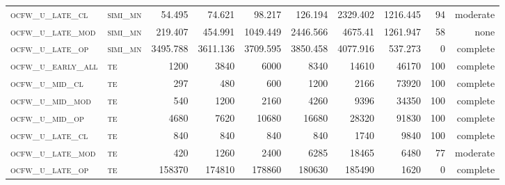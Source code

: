 \begin{landscape}
\begin{center}
\begin{footnotesize}
\begin{longtable}{llrrrrr|rrr}
\textsc{ocfw\_u\_late\_cl  } & \textsc{simi\_mn  }    & 54.495   & 74.621   & 98.217   & 126.194  & 2329.402  & 1216.445      & 94            & moderate       \\
\textsc{ocfw\_u\_late\_mod } & \textsc{simi\_mn  }    & 219.407  & 454.991  & 1049.449 & 2446.566 & 4675.41   & 1261.947      & 58            & none       \\
\textsc{ocfw\_u\_late\_op  } & \textsc{simi\_mn  }    & 3495.788 & 3611.136 & 3709.595 & 3850.458 & 4077.916  & 537.273       & 0             & complete           \\
\textsc{ocfw\_u\_early\_all} & \textsc{te  	     }    & 1200     & 3840     & 6000     & 8340     & 14610     & 46170         & 100           & complete            \\
\textsc{ocfw\_u\_mid\_cl   } & \textsc{te        }    & 297      & 480      & 600      & 1200     & 2166      & 73920         & 100           & complete            \\
\textsc{ocfw\_u\_mid\_mod  } & \textsc{te        }    & 540      & 1200     & 2160     & 4260     & 9396      & 34350         & 100           & complete            \\
\textsc{ocfw\_u\_mid\_op   } & \textsc{te        }    & 4680     & 7620     & 10680    & 16680    & 28320     & 91830         & 100           & complete            \\
\textsc{ocfw\_u\_late\_cl  } & \textsc{te        }    & 840      & 840      & 840      & 840      & 1740      & 9840          & 100           & complete            \\
\textsc{ocfw\_u\_late\_mod } & \textsc{te        }    & 420      & 1260     & 2400     & 6285     & 18465     & 6480          & 77            & moderate       \\
\textsc{ocfw\_u\_late\_op  } & \textsc{te        }    & 158370   & 174810   & 178860   & 180630   & 185490    & 1620          & 0             & complete          


\end{longtable}
\end{footnotesize}
\end{center}
\end{landscape}

\restoregeometry
\pagestyle{headings}


